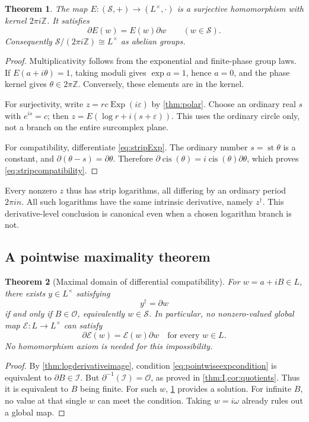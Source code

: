 \documentclass[11pt]{article}
\numberwithin{equation}{section}
\newtheorem{theorem}{Theorem}[section]
\theoremstyle{definition}
\newcommand{\Z}{\mathbb Z}
\newcommand{\OO}{\mathcal O}
\newcommand{\II}{\mathcal I}
\newcommand{\DD}{\partial}
\newcommand{\Exp}{\operatorname{Exp}}
\newcommand{\st}{\operatorname{st}}
\newcommand{\cis}{\operatorname{cis}}
\begin{document}
\begin{theorem}\label{thm:stripexp}
The map $E:(\mathcal S,+)\to(L^\times,\cdot)$ is a surjective
homomorphism with kernel $2\pi i\Z$. It satisfies
\begin{equation}\label{eq:stripcompatibility}
 \DD E(w)=E(w)\DD w\qquad(w\in\mathcal S).
\end{equation}
Consequently
$\mathcal S/(2\pi i\Z)\cong L^\times$ as abelian groups.
\end{theorem}
\begin{proof}
Multiplicativity follows from the exponential and finite-phase group
laws. If $E(a+i\theta)=1$, taking moduli gives $\exp a=1$, hence
$a=0$, and the phase kernel gives $\theta\in2\pi\Z$. Conversely,
these elements are in the kernel.

For surjectivity, write $z=r c\Exp(i\varepsilon)$ by
\cref{thm:polar}. Choose an ordinary real $s$ with $e^{is}=c$; then
$z=E(\log r+i(s+\varepsilon))$. This uses the ordinary circle only,
not a branch on the entire surcomplex plane.

For compatibility, differentiate \eqref{eq:stripExp}. The ordinary
number $s=\st\theta$ is a constant, and
$\DD(\theta-s)=\DD\theta$. Therefore
$\DD\cis(\theta)=i\cis(\theta)\DD\theta$, which proves
\eqref{eq:stripcompatibility}.
\end{proof}

Every nonzero $z$ thus has strip logarithms, all differing by an ordinary
period $2\pi i n$. All such logarithms have the same intrinsic
derivative, namely $z^\dagger$. This derivative-level conclusion is
canonical even when a chosen logarithm branch is not.

\subsection{A pointwise maximality theorem}
\begin{theorem}[Maximal domain of differential compatibility]
\label{thm:maximalstrip}
For $w=a+iB\in L$, there exists $y\in L^\times$ satisfying
\begin{equation}\label{eq:pointwiseexpcondition}
 y^\dagger=\DD w
\end{equation}
if and only if $B\in\OO$, equivalently $w\in\mathcal S$.
In particular, no nonzero-valued global map $\mathcal E:L\to L^\times$
can satisfy
\[
 \DD\mathcal E(w)=\mathcal E(w)\DD w
 \quad\text{for every }w\in L.
\]
No homomorphism axiom is needed for this impossibility.
\end{theorem}
\begin{proof}
By \cref{thm:logderivativeimage}, condition
\eqref{eq:pointwiseexpcondition} is equivalent to $\DD B\in\II$.
But $\DD^{-1}(\II)=\OO$, as proved in
\cref{thm:I,cor:quotients}. Thus it is equivalent to $B$ being finite.
For such $w$, \cref{thm:stripexp} provides a solution. For infinite $B$,
no value at that single $w$ can meet the condition. Taking $w=i\omega$
already rules out a global map.
\end{proof}
\end{document}
